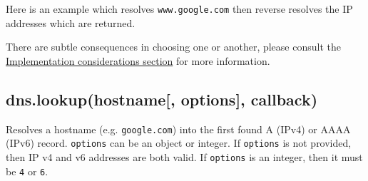 Here is an example which resolves
\texttt{\textquotesingle{}www.google.com\textquotesingle{}} then reverse
resolves the IP addresses which are returned.

\begin{Shaded}
\begin{Highlighting}[]
 \NormalTok{(}\NormalTok{);}

\NormalTok{(}\NormalTok{, } 
    

  \NormalTok{(} \NormalTok{+ }

  \NormalTok{(} 
     
       
         
      \NormalTok{\}}

      \NormalTok{(}  \NormalTok{+ }
    \NormalTok{\});}
  \NormalTok{\});}
\NormalTok{\});}
\end{Highlighting}
\end{Shaded}

There are subtle consequences in choosing one or another, please consult
the \hyperref[dnsux5fimplementationux5fconsiderations]{Implementation
considerations section} for more information.

\subsection{dns.lookup(hostname{[}, options{]},
callback)}\label{dns.lookuphostname-options-callback}

Resolves a hostname (e.g.
\texttt{\textquotesingle{}google.com\textquotesingle{}}) into the first
found A (IPv4) or AAAA (IPv6) record. \texttt{options} can be an object
or integer. If \texttt{options} is not provided, then IP v4 and v6
addresses are both valid. If \texttt{options} is an integer, then it
must be \texttt{4} or \texttt{6}.

